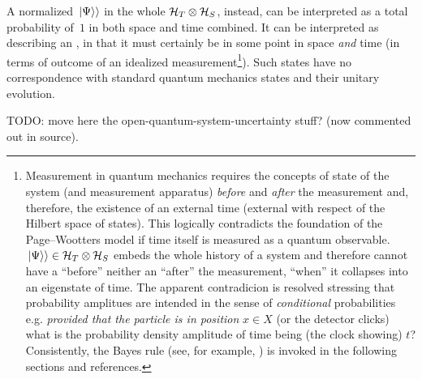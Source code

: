 A normalized $\left.\left| \Psi \right\rangle\right\rangle$ in the whole $\mathcal{H}_T \otimes \mathcal{H}_S$,
instead,
can be interpreted as a total probability of~$1$ in both space and time combined.
It can be interpreted as describing an ,
in that it
must certainly be in some point in space
\emph{and} time (in terms of outcome of an idealized measurement\footnote{
  Measurement in quantum mechanics requires the concepts
  of state of the system
  (and measurement apparatus)
  \emph{before} and \emph{after} the measurement and, therefore, the existence
  of an external time (external with respect of the Hilbert space of states).
  This logically contradicts the foundation of the Page--Wootters model if
  time itself is measured as a quantum observable. $\left.\left| \Psi \right\rangle\right\rangle \in \mathcal{H}_T \otimes \mathcal{H}_S$
  embeds the whole history of a system and therefore cannot have a
  ``before'' neither an ``after'' the measurement, ``when'' it collapses
  into an eigenstate of time. The apparent contradicion is resolved
  stressing that probability amplitues are intended in the sense of
  \emph{conditional} probabilities e.g. \emph{provided that the particle
  is in position} $x \in X$ (or the detector clicks)
  what is the probability density amplitude of time being (the clock showing) $t$?
  Consistently, the Bayes rule
  (see, for example, \cite{Stat:Conditional})
  is invoked in the following sections
  and references.
}).
Such states have no correspondence with standard quantum mechanics states and their unitary evolution.

TODO: move here the open-quantum-system-uncertainty stuff? (now commented out in source).